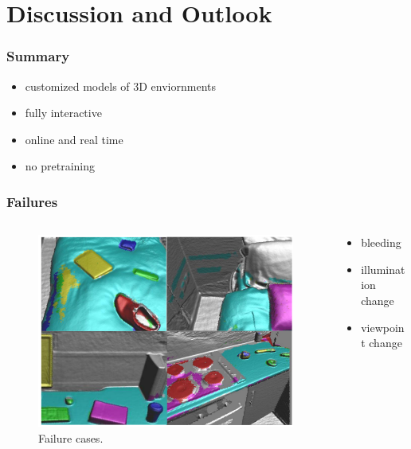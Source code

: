 \documentclass[mathserif, 10pt]{beamer}
\begin{document}
\section{Discussion and Outlook}
\begin{frame}
\frametitle{Summary}
\begin{itemize}
 \item customized models of 3D enviornments
 \item fully interactive
 \item online and real time
 \item no pretraining
\end{itemize}

\end{frame}

\begin{frame}
\frametitle{Failures}
\begin{columns}
 \begin{column}{0.5\textwidth}
  \begin{figure}[!ht]	 
  \center
  \includegraphics[width=\textwidth]{figures/failures}
  \caption{Failure cases.}
  \label{fig:failures}
  \end{figure}
 \end{column}
 
 \begin{column}{0.5\textwidth}
  \begin{itemize}
   \item bleeding
   \item illumination change
   \item viewpoint change
  \end{itemize}
 \end{column}
\end{columns}

\end{frame}
\end{document}
